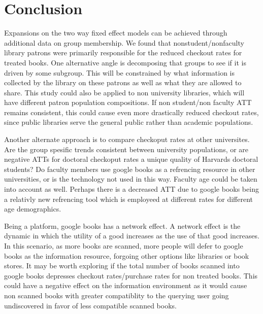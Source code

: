 \documentclass{article}
\begin{document}
\section{Conclusion}
Expansions on the two way fixed effect models can be achieved through additional data on group membership. We found that nonstudent/nonfaculty library patrons were primarily responsible for the reduced checkout rates for treated books. One alternative angle is decomposing that groups to see if it is driven by some subgroup. This will be constrained by what information is collected by the library on these patrons as well as what they are allowed to share. This study could also be applied to non university libraries, which will have different patron population compositions. If non student/non faculty ATT remains consistent, this could cause even more drastically reduced checkout rates, since public libraries serve the general public rather than academic populations.

Another alternate approach is to compare checkoput rates at other universites. Are the group spesific trends consistent between university populations, or are negative ATTs for doctoral checkoput rates a unique quality of Harvards doctoral students? Do faculty members use google books as a refrencing resource in other universities, or is the technology not used in this way. Faculty age could be taken into account as well. Perhaps there is a decreased ATT due to google books being a relativly new refrencing tool which is employeed at different rates for different age demographics.

Being a platform, google books has a network effect. A network effect is the dynamic in which the utility of a good increases as the use of that good increases. In this scenario, as more books are scanned, more people will defer to google books as the information resource, forgoing other options like libraries or book stores. It may be worth exploring if the total number of books scanned into google books depresses checkout rates/purchase rates for non treated books. This could have a negative effect on the information environment as it would cause non scanned books with greater compatiblity to the querying user going undiscovered in favor of less compatible scanned books. 
\end{document}
